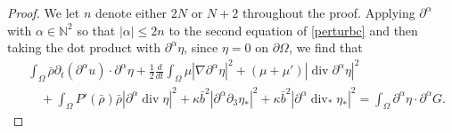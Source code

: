 \documentclass[a4paper,reqno,11pt]{amsart}
\numberwithin{equation}{section}
\providecommand{\abs}[1]{\left\vert#1\right\vert}
\begin{document}
\begin{proof}
We let $n$ denote either $2N$ or $N+2$ throughout the proof. Applying $\partial^\alpha$ with ${\alpha}\in \mathbb{N}^{2}$ so that $ |{\alpha}|\le 2n$ to the second equation of \eqref{perturbc} and then taking the dot product with ${\partial}^{\alpha} \eta$, since $\eta=0$ on ${\partial}\Omega$,  we find that
\begin{equation} \label{p_u_e_111'c}
\begin{split}
 &\int_\Omega \bar \rho {\partial_t} (\partial^\alpha    u) \cdot \partial^\alpha \eta
  + {\frac{1}{2}}{ \frac{d}{dt}}\int_\Omega  \mu  \abs{ \nabla{\partial}^{\alpha} \eta}^2 +(\mu+\mu') \abs{ \operatorname{div}{\partial}^{\alpha} \eta}^2
\\&\quad+  \int_\Omega  P'(\bar\rho)\bar\rho \abs{ {\partial}^{\alpha} \operatorname{div}  \eta }^2+\kappa\bar b^2\abs{{\partial}^{\alpha}{\partial}_3   \eta_\ast }^2 +  \kappa\bar b^2\abs{ {\partial}^{\alpha} \operatorname{div}_\ast  \eta_\ast }^2
 =  \int_\Omega   {\partial}^{\alpha} \eta  \cdot  {\partial}^{\alpha} G .
\end{split}
\end{equation}


\end{proof}
\end{document}
